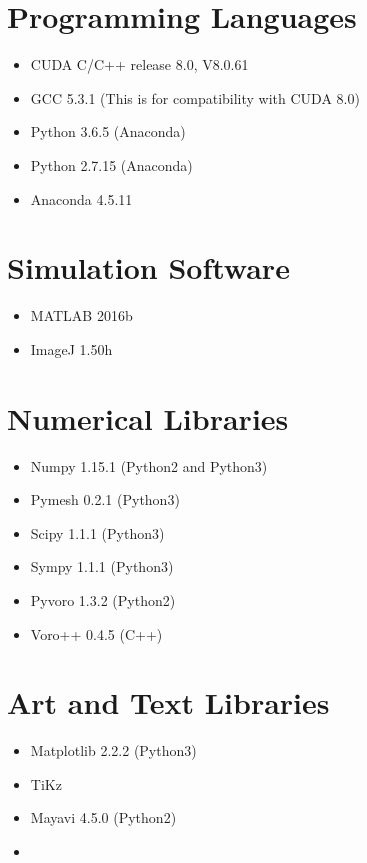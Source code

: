 \section{Programming Languages}
\begin{itemize}
    \item CUDA C/C++ release 8.0, V8.0.61
    \item GCC 5.3.1 (This is for compatibility with CUDA 8.0)
    \item Python 3.6.5 (Anaconda)
    \item Python 2.7.15 (Anaconda)
    \item Anaconda 4.5.11
\end{itemize}

\section{Simulation Software}
\begin{itemize}
    \item MATLAB 2016b
    \item ImageJ 1.50h
\end{itemize}

\section{Numerical Libraries}
\begin{itemize}
    \item Numpy 1.15.1 (Python2 and Python3)
    \item Pymesh 0.2.1 (Python3)
    \item Scipy 1.1.1 (Python3)
    \item Sympy 1.1.1 (Python3)
    \item Pyvoro 1.3.2 (Python2)
    \item Voro++ 0.4.5 (C++)
\end{itemize}

\section{Art and Text Libraries}
\begin{itemize}
    \item Matplotlib 2.2.2 (Python3)
    \item TiKz \pgfversion
    \item Mayavi 4.5.0 (Python2)
    \item \LaTeXe
\end{itemize}

